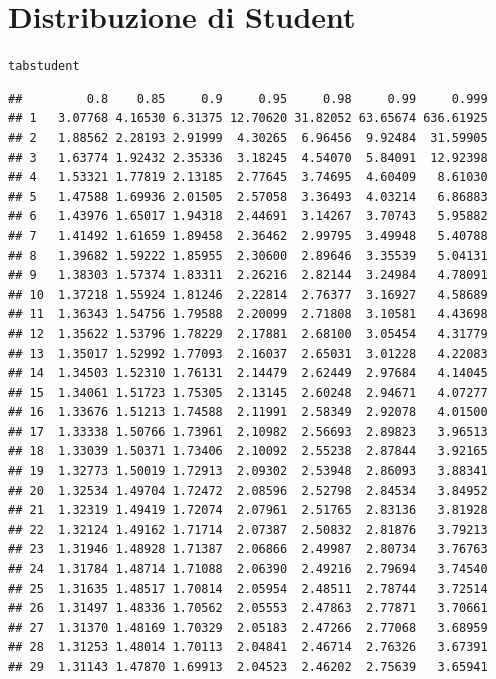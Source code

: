 \documentclass[onecolumn,12pt]{book}\usepackage[]{graphicx}\usepackage[]{color}
\makeatletter
\newcommand{\hlstd}[1]{\textcolor[rgb]{0.345,0.345,0.345}{#1}}%
\newenvironment{kframe}{%
 \def\at@end@of@kframe{}%
 \ifinner\ifhmode%
  \def\at@end@of@kframe{\end{minipage}}%
  \begin{minipage}{\columnwidth}%
 \fi\fi%
 \def\FrameCommand##1{\hskip\@totalleftmargin \hskip-\fboxsep
 \colorbox{shadecolor}{##1}\hskip-\fboxsep
     \hskip-\linewidth \hskip-\@totalleftmargin \hskip\columnwidth}%
 \MakeFramed {\advance\hsize-\width
   \@totalleftmargin\z@ \linewidth\hsize
   \@setminipage}}%
 {\par\unskip\endMakeFramed%
 \at@end@of@kframe}
\newenvironment{knitrout}{}{} %
\makeatother
\begin{document}
\section*{Distribuzione di Student}
\oddsidemargin 0.0in
\evensidemargin 0.0in
\topmargin -0.4in
\begin{knitrout}
\color{fgcolor}\begin{kframe}
\begin{alltt}
 \hlstd{tabstudent}
\end{alltt}
\begin{verbatim}
##         0.8    0.85     0.9     0.95     0.98     0.99     0.999
## 1   3.07768 4.16530 6.31375 12.70620 31.82052 63.65674 636.61925
## 2   1.88562 2.28193 2.91999  4.30265  6.96456  9.92484  31.59905
## 3   1.63774 1.92432 2.35336  3.18245  4.54070  5.84091  12.92398
## 4   1.53321 1.77819 2.13185  2.77645  3.74695  4.60409   8.61030
## 5   1.47588 1.69936 2.01505  2.57058  3.36493  4.03214   6.86883
## 6   1.43976 1.65017 1.94318  2.44691  3.14267  3.70743   5.95882
## 7   1.41492 1.61659 1.89458  2.36462  2.99795  3.49948   5.40788
## 8   1.39682 1.59222 1.85955  2.30600  2.89646  3.35539   5.04131
## 9   1.38303 1.57374 1.83311  2.26216  2.82144  3.24984   4.78091
## 10  1.37218 1.55924 1.81246  2.22814  2.76377  3.16927   4.58689
## 11  1.36343 1.54756 1.79588  2.20099  2.71808  3.10581   4.43698
## 12  1.35622 1.53796 1.78229  2.17881  2.68100  3.05454   4.31779
## 13  1.35017 1.52992 1.77093  2.16037  2.65031  3.01228   4.22083
## 14  1.34503 1.52310 1.76131  2.14479  2.62449  2.97684   4.14045
## 15  1.34061 1.51723 1.75305  2.13145  2.60248  2.94671   4.07277
## 16  1.33676 1.51213 1.74588  2.11991  2.58349  2.92078   4.01500
## 17  1.33338 1.50766 1.73961  2.10982  2.56693  2.89823   3.96513
## 18  1.33039 1.50371 1.73406  2.10092  2.55238  2.87844   3.92165
## 19  1.32773 1.50019 1.72913  2.09302  2.53948  2.86093   3.88341
## 20  1.32534 1.49704 1.72472  2.08596  2.52798  2.84534   3.84952
## 21  1.32319 1.49419 1.72074  2.07961  2.51765  2.83136   3.81928
## 22  1.32124 1.49162 1.71714  2.07387  2.50832  2.81876   3.79213
## 23  1.31946 1.48928 1.71387  2.06866  2.49987  2.80734   3.76763
## 24  1.31784 1.48714 1.71088  2.06390  2.49216  2.79694   3.74540
## 25  1.31635 1.48517 1.70814  2.05954  2.48511  2.78744   3.72514
## 26  1.31497 1.48336 1.70562  2.05553  2.47863  2.77871   3.70661
## 27  1.31370 1.48169 1.70329  2.05183  2.47266  2.77068   3.68959
## 28  1.31253 1.48014 1.70113  2.04841  2.46714  2.76326   3.67391
## 29  1.31143 1.47870 1.69913  2.04523  2.46202  2.75639   3.65941

\end{verbatim}
\end{kframe}
\end{knitrout}
\end{document}
